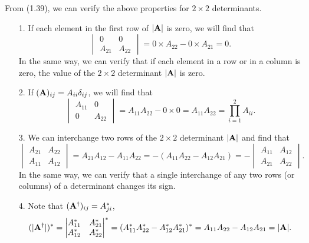 \documentclass[a4paper]{book}
\newcounter{solution}[chapter]
\newcommand{\A}{{\bf A}}
\begin{document}
	\begin{solution}

	From (1.39), we can verify the above properties for $2\times2$ determinants.

	\begin{itemize}
	
	\item[1.] If each element in the first row of $|\A|$ is zero, we will find that
	\[
		\begin{vmatrix}
			0  & 0 \\ A_{21} &  A_{22} 
		\end{vmatrix} = 0 \times A_{22} - 0 \times A_{21} = 0 .
	\]
	In the same way, we can verify that if each element in a row or in a column is zero, the value of the $2 \times 2$ determinant $|\A|$ is zero.
	
	\item[2.] If $(\A)_{ij} = A_{ii} \delta_{ij}$, we will find that
	\[
		\begin{vmatrix}
			A_{11}  & 0 \\ 0 & A_{22} 
		\end{vmatrix} = A_{11} A_{22} - 0 \times 0 = A_{11} A_{22} = \prod_{ i=1 }^2 A_{ii} .
	\]
	
	\item[3.] We can interchange two rows of the $2\times2$ determinant $|\A|$ and find that
	\[
		\begin{vmatrix}
			A_{21}  & A_{22} \\ A_{11} & A_{12} 
		\end{vmatrix} = A_{21} A_{12} - A_{11} A_{22} = - ( A_{11} A_{22} - A_{12} A_{21} ) = - \begin{vmatrix}
			A_{11}  & A_{12} \\ A_{21} & A_{22} 
		\end{vmatrix} .
	\]
	In the same way, we can verify that a single interchange of any two rows (or columns) of a determinant changes its sign.
	
	\item[4.] Note that $(\A^\dagger)_{ij} = A^*_{ji}$,
	\[
		(| \A^\dagger |)^* = \begin{vmatrix}
			A^*_{11}  & A^*_{21} \\ A^*_{12} & A^*_{22} 
		\end{vmatrix}^* = ( A^*_{11} A^*_{22} - A^*_{12} A^*_{21} )^* = A_{11} A_{22} - A_{12} A_{21} = | \A | .
	\]	
	

\end{itemize}
\end{solution}
\end{document}
